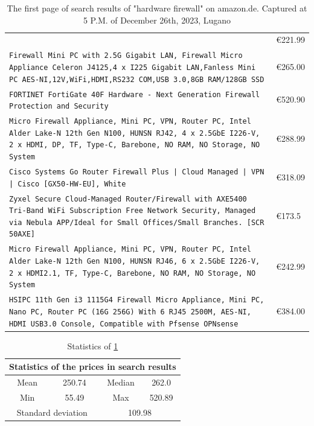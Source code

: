 \documentclass[mscthesis]{usiinfthesis}
\begin{document}
\begin{table}[H]
\begin{tabular}{|p{113mm}|p{12mm}|}
{    }    & €221.99 \\
    \texttt{Firewall Mini PC with 2.5G Gigabit LAN, Firewall Micro Appliance Celeron J4125,4 x I225 Gigabit LAN,Fanless Mini PC AES-NI,12V,WiFi,HDMI,RS232 COM,USB 3.0,8GB RAM/128GB SSD
    }    & €265.00 \\
    \rowcolor[gray]{0.8} \texttt{FORTINET FortiGate 40F Hardware - Next Generation Firewall Protection and Security
    }    & €520.90 \\
    \texttt{Micro Firewall Appliance, Mini PC, VPN, Router PC, Intel Alder Lake-N 12th Gen N100, HUNSN RJ42, 4 x 2.5GbE I226-V, 2 x HDMI, DP, TF, Type-C, Barebone, NO RAM, NO Storage, NO System
    }    & €288.99 \\
    \rowcolor[gray]{0.8} \texttt{Cisco Systems Go Router Firewall Plus | Cloud Managed | VPN | Cisco [GX50-HW-EU], White
    }    & €318.09 \\
    \texttt{Zyxel Secure Cloud-Managed Router/Firewall with AXE5400 Tri-Band WiFi Subscription Free Network Security, Managed via Nebula APP/Ideal for Small Offices/Small Branches. [SCR 50AXE]
    }    & €173.5  \\
    \rowcolor[gray]{0.8} \texttt{Micro Firewall Appliance, Mini PC, VPN, Router PC, Intel Alder Lake-N 12th Gen N100, HUNSN RJ46, 6 x 2.5GbE I226-V, 2 x HDMI2.1, TF, Type-C, Barebone, NO RAM, NO Storage, NO System
    }    & €242.99 \\
    \texttt{HSIPC 11th Gen i3 1115G4 Firewall Micro Appliance, Mini PC, Nano PC, Router PC (16G 256G) With 6 RJ45 2500M, AES-NI, HDMI USB3.0 Console, Compatible with Pfsense OPNsense
    }    & €384.00 \\
    \hline
  \end{tabular}
  \caption{The first page of search results of "hardware firewall" on amazon.de. Captured at 5 P.M. of December 26th, 2023, Lugano}
  \label{tab:amazon-search}
\end{table}

\begin{table}[H]
  \centering
  \begin{tabular}{|c|c|c|c|}
    \hline
    \multicolumn{4}{|c|}{Statistics of the prices in search results}                         \\
    \hline
    Mean                                     & 250.74                      & Median & 262.0  \\
    \hline
    Min                                      & 55.49                       & Max    & 520.89 \\
    \hline
    \multicolumn{2}{|c|}{Standard deviation} & \multicolumn{2}{c|}{109.98}                   \\
    \hline
  \end{tabular}
  \caption{Statistics of \cref{tab:amazon-search}}
  \label{tab:amazon-search-stat}
\end{table}
\end{document}

